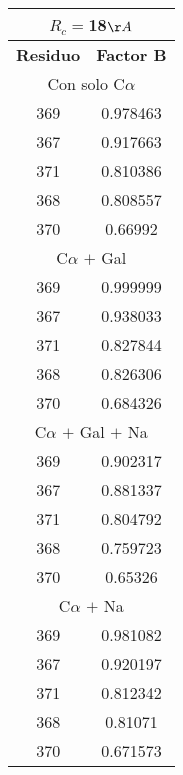 \begin{tabular}[c]{|c|c|}
\multicolumn{2}{c}{$R_c=$18$\AA$}\\\hline
\textbf{Residuo}&\textbf{Factor B}\\\hline
\multicolumn{2}{c}{Con solo C$\alpha$}\\\hline
       369&  0.978463\\
       367&  0.917663\\
       371&  0.810386\\
       368&  0.808557\\
       370&   0.66992\\
\hline
\multicolumn{2}{c}{C$\alpha$ $+$ Gal}\\\hline
       369&  0.999999\\
       367&  0.938033\\
       371&  0.827844\\
       368&  0.826306\\
       370&  0.684326\\
\hline
\multicolumn{2}{c}{C$\alpha$ $+$ Gal $+$ Na}\\\hline
       369&  0.902317\\
       367&  0.881337\\
       371&  0.804792\\
       368&  0.759723\\
       370&   0.65326\\
\hline
\multicolumn{2}{c}{C$\alpha$ $+$ Na}\\\hline
       369&  0.981082\\
       367&  0.920197\\
       371&  0.812342\\
       368&   0.81071\\
       370&  0.671573\\
\hline
\end{tabular}
